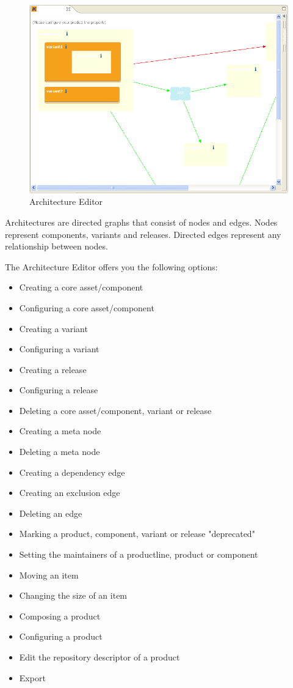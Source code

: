 \begin{figure}[h!]
\begin{center}
\includegraphics[width=15cm]{architecture.png}
   \caption{Architecture Editor}
\label{architecture}
\end{center}
\end{figure}\par

Architectures are directed graphs that consist of nodes and edges. 
Nodes represent components, variants and releases. Directed edges represent
any relationship between nodes.\par

The Architecture Editor offers you the following options:
\begin{itemize}
	\item Creating a core asset/component
	\item Configuring a core asset/component
	\item Creating a variant
	\item Configuring a variant
	\item Creating a release
	\item Configuring a release
	\item Deleting a core asset/component, variant or release
	\item Creating a meta node
	\item Deleting a meta node
	\item Creating a dependency edge
	\item Creating an exclusion edge
	\item Deleting an edge
	\item Marking a product, component, variant or release "deprecated"
	\item Setting the maintainers of a productline, product or component
	\item Moving an item
	\item Changing the size of an item
	\item Composing a product
	\item Configuring a product
	\item Edit the repository descriptor of a product
	\item Export
\end{itemize}

